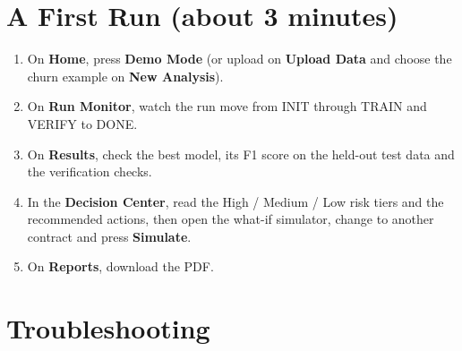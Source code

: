 \FloatBarrier
\section{A First Run (about 3 minutes)}\label{sec:A.5}

\begin{enumerate}
  \item On \textbf{Home}, press \textbf{Demo Mode} (or upload  on \textbf{Upload Data} and choose the churn example on \textbf{New Analysis}).
  \item On \textbf{Run Monitor}, watch the run move from INIT through TRAIN and VERIFY to DONE.
  \item On \textbf{Results}, check the best model, its F1 score on the held-out test data and the verification checks.
  \item In the \textbf{Decision Center}, read the High / Medium / Low risk tiers and the recommended actions, then open the what-if simulator, change  to another contract and press \textbf{Simulate}.
  \item On \textbf{Reports}, download the PDF.
\end{enumerate}

\FloatBarrier
\section{Troubleshooting}\label{sec:A.6}

